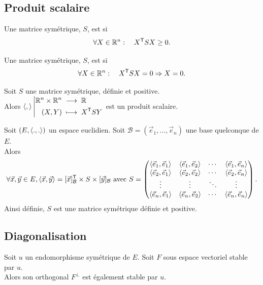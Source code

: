 \documentclass{book}
\begin{document}
\subsection{Produit scalaire}
\begin{Definition}[Positive]
Une matrice symétrique, $S$, est  si $$\forall X\in  \mathbb{R}^n :\quad X^{\mathsf {T}} S X \geq 0.$$
\end{Definition}
\begin{Definition}[Définie]
Une matrice symétrique, $S$, est  si $$\forall X\in \mathbb{R}^n :\quad X^{\mathsf {T}} S X = 0 \Rightarrow X = 0.$$
\end{Definition}
\begin{Proposition}
Soit $S$ une matrice symétrique, définie et positive.\\
Alors ${\langle,\rangle}\left|\begin{aligned}{\mathbb{R}^n\times \mathbb{R}^n }&\;\longrightarrow\;{\mathbb{R}}\\{(X,Y)}&\;\longmapsto\;{X^{\mathsf {T}} S Y}\end{aligned}\right.$ est un produit scalaire.
\end{Proposition}
\begin{Proposition}
Soit $(E,\langle.,.\rangle)$ un espace euclidien. Soit $\mathcal{B}=(\vec{e}_1,\dots,\vec{e}_n)$ une base quelconque de $E$.\\
Alors
$$\forall \vec{x},\vec{y}\in E, \langle\vec{x},\vec{y}\rangle=[\vec{x}]_{\mathcal{B}}^{\mathsf {T}}\times S \times [\vec{y}]_{\mathcal{B}} \text{ avec } S=\begin{pmatrix}\langle\vec{e}_1,\vec{e}_1\rangle&\langle\vec{e}_1,\vec{e}_2\rangle&\cdots &\langle\vec{e}_1,\vec{e}_n\rangle\\ \langle\vec{e}_2,\vec{e}_1\rangle&\langle\vec{e}_2,\vec{e}_2\rangle&\cdots &\langle\vec{e}_2,\vec{e}_n\rangle\\\vdots &\vdots &\ddots &\vdots \\\langle\vec{e}_n,\vec{e}_1\rangle&\langle\vec{e}_n,\vec{e}_2\rangle&\cdots &\langle\vec{e}_n,\vec{e}_n\rangle\end{pmatrix}.$$
Ainsi définie, $S$ est une matrice symétrique définie et positive. 
\end{Proposition}


\subsection{Diagonalisation}

\begin{Lemme}
Soit $u$ un endomorphisme symétrique de $E$. Soit $F$ sous espace vectoriel stable par
$u$.\\
Alors son orthogonal $F^{\perp}$ est également stable par $u$.
\end{Lemme}
\end{document}
